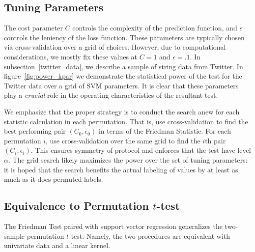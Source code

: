 \subsection{Tuning Parameters}
The cost parameter $C$ controls the complexity of the
prediction function, and $\epsilon$ controls the leniency of the loss
function.  These parameters are typically chosen via cross-validation
over a grid of choices.  However, due to computational considerations,
we mostly fix these values at $C = 1$ and $\epsilon = .1$.  In
subsection~\ref{twitter_data}, we describe a sample of string data
from Twitter.  In figure~\ref{fig:power_kpar} we demonstrate the
statistical power of the test for the Twitter data over a grid of SVM
parameters.  It is clear that these parameters play a \emph{crucial}
role in the operating characteristics of the resultant test.  

We emphasize that the proper strategy is to conduct the search anew
for each statistic calculation in each permutation.  That is, use cross-validation to
find the best performing pair $(C_0, \epsilon_0)$ in terms of the
Friedman Statistic.  For each permutation $i$, use cross-validation
over the same grid to find the $i$th pair $(C_i, \epsilon_i)$.  This
ensures symmetry of protocol and enforces that the test have level
$\alpha$.  The grid search likely maximizes the power over the set of
tuning parameters: it is hoped that the search benefits the actual
labeling of values by at least as much as it does permuted labels.

\subsection{Equivalence to Permutation $t$-test}
\begin{theorem}
  \label{friedman_equiv}
  The Friedman Test paired with support vector regression generalizes
  the two-sample permutation $t$-test. Namely, the two procedures are
  equivalent with univariate data and a linear kernel.
\end{theorem}

